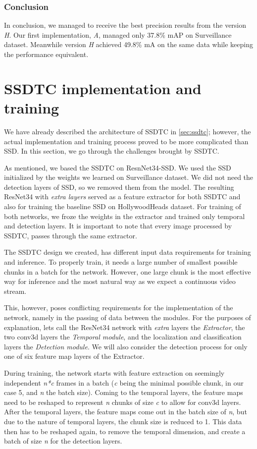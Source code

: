 \subsubsection{Conclusion}
In conclusion, we managed to receive the best precision results from the version \textit{H}. Our first implementation, \textit{A}, managed only 37.8\% mAP on Surveillance dataset. Meanwhile version \textit{H} achieved 49.8\% mA on the same data while keeping the performance equivalent.

\section{SSDTC implementation and training}
\label{sec:ssdtcImpl}
We have already described the architecture of SSDTC in \cref{sec:ssdtc}; however, the actual implementation and training process proved to be more complicated than SSD. In this section, we go through the challenges brought by SSDTC. 

As mentioned, we based the SSDTC on ResnNet34-SSD. We used the SSD initialized by the weights we learned on Surveillance dataset. We did not need the detection layers of SSD, so we removed them from the model. The resulting ResNet34 with \textit{extra layers} served as a feature extractor for both SSDTC and also for training the baseline SSD on HollywoodHeads dataset. For training of both networks, we froze the weights in the extractor and trained only temporal and detection layers. It is important to note that every image processed by SSDTC, passes through the same extractor. 

The SSDTC design we created, has different input data requirements for training and inference. To properly train, it needs a large number of smallest possible chunks in a batch for the network. However, one large chunk is the most effective way for inference and the most natural way as we expect a continuous video stream.

This, however, poses conflicting requirements for the implementation of the network, namely in the passing of data between the modules. For the purposes of explanation, lets call the ResNet34 network with \textit{extra} layers the \textit{Extractor}, the two conv3d layers the \textit{Temporal module}, and the localization and classification layers the \textit{Detection module}. We will also consider the detection process for only one of six feature map layers of the Extractor. 

During training, the network starts with feature extraction on seemingly independent \textit{n*c} frames in a batch (\textit{c} being the minimal possible chunk, in our case 5, and \textit{n} the batch size). Coming to the temporal layers, the feature maps need to be reshaped to represent \textit{n} chunks of size \textit{c} to allow for conv3d layers. After the temporal layers, the feature maps come out in the batch size of \textit{n}, but due to the nature of temporal layers, the chunk size is reduced to 1. This data then has to be reshaped again, to remove the temporal dimension, and create a batch of size \textit{n} for the detection layers.  

